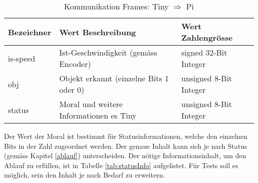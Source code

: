 \documentclass[../../main.tex]{subfiles}
\begin{document}
    \begin{table}[H] \centering
        \begin{tabular}{|l|l|l|}
        \hline
        \textbf{Bezeichner} & \textbf{Wert Beschreibung}                                  & \textbf{Wert Zahlengrösse} \\ \hline
        is-speed            & Ist-Geschwindigkeit (gemäss Encoder)                        & signed 32-Bit Integer      \\ \hline
        obj                 & Objekt erkannt (einzelne Bits 1 oder 0)                     & unsigned 8-Bit Integer     \\ \hline
        status              & Moral und weitere Informationen es Tiny                     & unsigned 8-Bit Integer     \\ \hline
        \end{tabular}

        \caption{Kommunikation Frames: Tiny $\Rightarrow$ Pi}
        \label{tab:com_tiny_pi}
        \end{table}

        Der Wert der Moral ist bestimmt für Statusinformationen, welche den einzelnen Bits in der Zahl zugeordnet werden. Der genaue Inhalt kann sich je nach Status (gemäss Kapitel \ref{ablauf}) unterscheiden. Der nötige Informationsinhalt, um den Ablauf zu erfüllen, ist in Tabelle \ref{tab:statusInfo} aufgelistet. Für Tests soll es möglich, sein den Inhalt je nach Bedarf zu erweitern.
\end{document}
